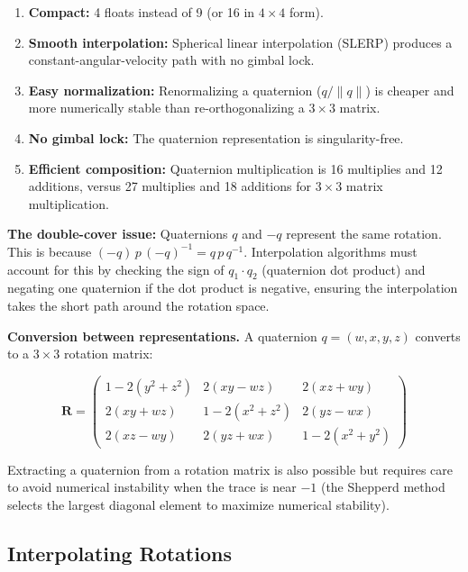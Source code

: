 \documentclass[
  11pt,
  letterpaper,
  DIV=11,
  numbers=noendperiod,
  twoside,
  open=right]{scrreprt}
\providecommand{\tightlist}{%
  \setlength{\itemsep}{0pt}\setlength{\parskip}{0pt}}
\begin{document}
\begin{enumerate}
\def\labelenumi{\arabic{enumi}.}
\tightlist
\item
  \textbf{Compact:} 4 floats instead of 9 (or 16 in \(4 \times 4\)
  form).
\item
  \textbf{Smooth interpolation:} Spherical linear interpolation (SLERP)
  produces a constant-angular-velocity path with no gimbal lock.
\item
  \textbf{Easy normalization:} Renormalizing a quaternion
  (\(q / \|q\|\)) is cheaper and more numerically stable than
  re-orthogonalizing a \(3 \times 3\) matrix.
\item
  \textbf{No gimbal lock:} The quaternion representation is
  singularity-free.
\item
  \textbf{Efficient composition:} Quaternion multiplication is 16
  multiplies and 12 additions, versus 27 multiplies and 18 additions for
  \(3 \times 3\) matrix multiplication.
\end{enumerate}

\textbf{The double-cover issue:} Quaternions \(q\) and \(-q\) represent
the same rotation. This is because
\((-q) \, p \, (-q)^{-1} = q \, p \, q^{-1}\). Interpolation algorithms
must account for this by checking the sign of \(q_1 \cdot q_2\)
(quaternion dot product) and negating one quaternion if the dot product
is negative, ensuring the interpolation takes the short path around the
rotation space.

\textbf{Conversion between representations.} A quaternion
\(q = (w, x, y, z)\) converts to a \(3 \times 3\) rotation matrix:

\[
\mathbf{R} = \begin{pmatrix}
  1 - 2(y^2 + z^2) & 2(xy - wz) & 2(xz + wy) \\
  2(xy + wz) & 1 - 2(x^2 + z^2) & 2(yz - wx) \\
  2(xz - wy) & 2(yz + wx) & 1 - 2(x^2 + y^2)
\end{pmatrix}
\]

Extracting a quaternion from a rotation matrix is also possible but
requires care to avoid numerical instability when the trace is near
\(-1\) (the Shepperd method selects the largest diagonal element to
maximize numerical stability).

\subsection{Interpolating Rotations}\label{interpolating-rotations}
\end{document}
